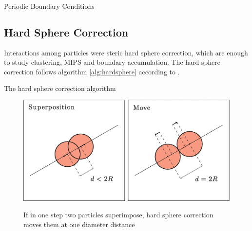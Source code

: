 \documentclass[../../master_thesis_np.tex]{subfiles}
\begin{document}
	\begin{algorithm}[htp]
		\caption{Periodic Boundary Conditions} \label{alg:pbc}	
		\begin{algorithmic}[1]
			\EndIf
			\EndIf
			\EndFor
		\end{algorithmic}
	\end{algorithm}
	
	\subsection{Hard Sphere Correction}
	\label{hs}
	Interactions among particles were steric hard sphere correction, which are enough to study clustering, MIPS and boundary accumulation.
	The hard sphere correction follows algorithm \ref{alg:hardsphere} according to \cite{callegari_numerical_2019}.
	
	
	\begin{algorithm}[htp]
		\caption{The hard sphere correction algorithm} \label{alg:hardsphere}	
		\begin{algorithmic}[1]
			 
			
			\EndIf
			\EndFor
		\end{algorithmic}
	\end{algorithm}
	
	\begin{figure}[htp]
		\centering
		\includegraphics[width = \textwidth]{callegari_volpe_2019_hardsphere.png}
		\label{fig:hardsphere}
		\caption{If in one step two particles superimpose, hard sphere correction moves them at one diameter distance \cite{callegari_numerical_2019}}
	\end{figure}
	
\end{document}
